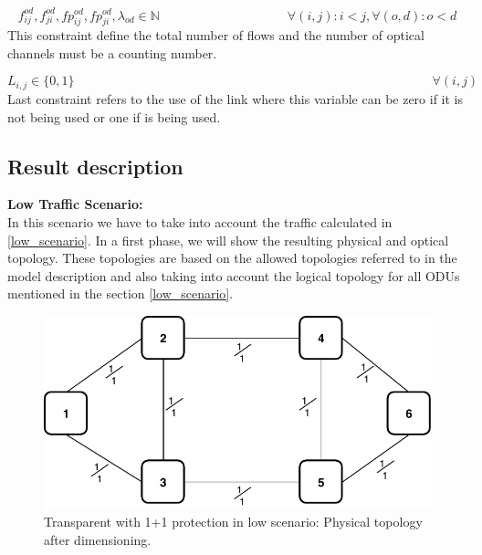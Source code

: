 \begin{equation}
f_{ij}^{od} , f_{ji}^{od} , fp_{ij}^{od} , fp_{ji}^{od} , \lambda_{od} \in \mathbb{N}   \qquad \qquad \qquad \qquad \qquad
\forall(i,j) : i < j, \forall(o,d) : o < d
\label{ILPTransp5}
\end{equation}
\noindent
This constraint define the total number of flows and the number of optical channels must be a counting number.

\begin{equation}
L_{i,j} \in \{0,1\} \qquad \qquad \qquad \qquad \qquad \qquad \qquad \qquad \qquad \qquad \qquad \qquad \qquad \qquad
\forall(i,j)
\label{ILPTranspL1}
\end{equation}
\noindent
Last constraint refers to the use of the link where this variable can be zero if it is not being used or one if is being used.

\subsection{Result description}

\textbf{Low Traffic Scenario:}\\

In this scenario we have to take into account the traffic calculated in \ref{low_scenario}. In a first phase, we will show the resulting physical and optical topology. These topologies are based on the allowed topologies referred to in the model description and also taking into account the logical topology for all ODUs mentioned in the section \ref{low_scenario}.\\

\begin{figure}[h!]
\centering
\includegraphics[width=12cm]{sdf/ilp/transparent_protection/figures/physical_topology}
\caption{Transparent with 1+1 protection in low scenario: Physical topology after dimensioning.}
\label{physical2_protectionlow}
\end{figure}

